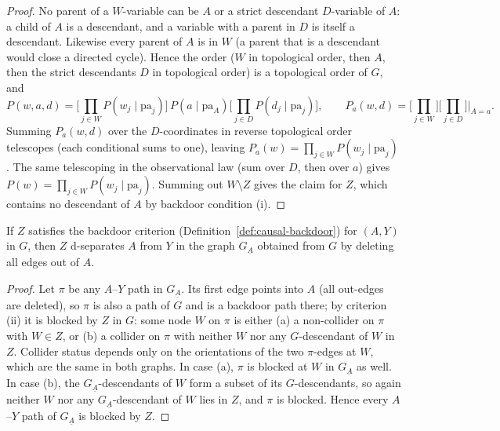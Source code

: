 \begin{proof}
No parent of a $W$-variable can be $A$ or a strict descendant $D$-variable of $A$: a child of $A$ is
a descendant, and a variable with a parent in $D$ is itself a descendant. Likewise every parent of
$A$ is in $W$ (a parent that is a descendant would close a directed cycle). Hence the order ($W$ in
topological order, then $A$, then the strict descendants $D$ in topological order) is a topological
order of $G$, and
\[
P(w, a, d) = \Big[\textstyle\prod_{j \in W} P(w_j \mid \mathrm{pa}_j)\Big]\, P(a \mid \mathrm{pa}_A)
\Big[\textstyle\prod_{j \in D} P(d_j \mid \mathrm{pa}_j)\Big],
\qquad
P_a(w, d) = \Big[\textstyle\prod_{j \in W}\Big]\Big[\textstyle\prod_{j \in D}\Big]\Big|_{A=a}.
\]
Summing $P_a(w,d)$ over the $D$-coordinates in reverse topological order telescopes (each
conditional sums to one), leaving $P_a(w) = \prod_{j \in W} P(w_j \mid \mathrm{pa}_j)$. The same
telescoping in the observational law (sum over $D$, then over $a$) gives $P(w) = \prod_{j \in W}
P(w_j \mid \mathrm{pa}_j)$. Summing out $W \setminus Z$ gives the claim for $Z$, which contains no
descendant of $A$ by backdoor condition (i).
\end{proof}

\begin{lemma}
\label{lem:app-block}
If $Z$ satisfies the backdoor criterion (Definition~\ref{def:causal-backdoor}) for $(A, Y)$ in $G$,
then $Z$ d-separates $A$ from $Y$ in the graph $G_{\underline{A}}$ obtained from $G$ by deleting all
edges out of $A$.
\end{lemma}

\begin{proof}
Let $\pi$ be any $A$--$Y$ path in $G_{\underline{A}}$. Its first edge points into $A$ (all out-edges
are deleted), so $\pi$ is also a path of $G$ and is a backdoor path there; by criterion (ii) it is
blocked by $Z$ in $G$: some node $W$ on $\pi$ is either (a) a non-collider on $\pi$ with $W \in Z$,
or (b) a collider on $\pi$ with neither $W$ nor any $G$-descendant of $W$ in $Z$. Collider status
depends only on the orientations of the two $\pi$-edges at $W$, which are the same in both graphs.
In case (a), $\pi$ is blocked at $W$ in $G_{\underline{A}}$ as well. In case (b), the
$G_{\underline{A}}$-descendants of $W$ form a subset of its $G$-descendants, so again neither $W$
nor any $G_{\underline{A}}$-descendant of $W$ lies in $Z$, and $\pi$ is blocked. Hence every
$A$--$Y$ path of $G_{\underline{A}}$ is blocked by $Z$.
\end{proof}

